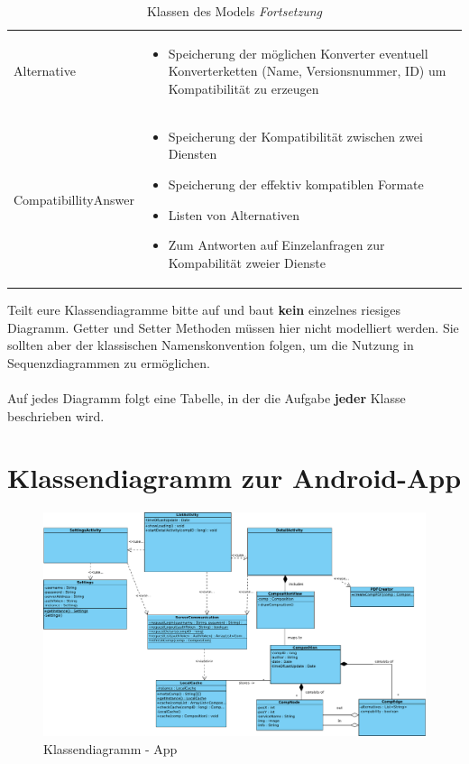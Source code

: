 \begin{table}
\begin{tabularx}{\textwidth}{p{} | X}
		Alternative & \compress \begin{itemize}
			\item Speicherung der möglichen Konverter eventuell Konverterketten (Name, Versionsnummer, ID) um Kompatibilität zu erzeugen
		\end{itemize}\\
		\rowcolor[HTML]{E7E7E7}
		CompatibillityAnswer & \compress \begin{itemize}
			\item Speicherung der Kompatibilität zwischen zwei Diensten
			\item Speicherung der effektiv kompatiblen Formate
			\item Listen von Alternativen
			\item Zum Antworten auf Einzelanfragen zur Kompabilität zweier Dienste
		\end{itemize}\\
	\end{tabularx}
	\caption{Klassen des Models \textit{Fortsetzung}}
\end{table}

\begin{tcolorbox}
Teilt eure Klassendiagramme bitte auf und baut \textbf{kein} einzelnes riesiges Diagramm.
Getter und Setter Methoden müssen hier nicht modelliert werden.
Sie sollten aber der klassischen Namenskonvention folgen, um die Nutzung in Sequenzdiagrammen zu ermöglichen.
\\\\
Auf jedes Diagramm folgt eine Tabelle, in der die Aufgabe \textbf{jeder} Klasse beschrieben wird.
\end{tcolorbox}

\section*{Klassendiagramm zur Android-App}

\begin{figure}[h]
	\centering
	\includegraphics[width=\textwidth]{Klassendiagramm_App/Class_Diagram1}
	\caption{Klassendiagramm - App}
	\label{fig:klassendiagramm-a}
\end{figure}

